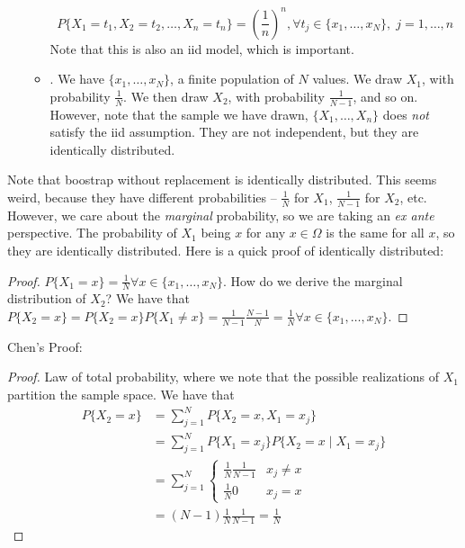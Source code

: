 \documentclass[10pt]{article}
\begin{document}
\begin{definition}
\begin{itemize}
\begin{itemize}
			\[
			P\{X_1 = t_1,X_2 = t_2,\dots,X_n = t_n\} = \left(\frac{1}{n}\right)^n, \forall t_j \in \{x_1,\dots,x_N\},\;j = 1,\dots,n
			\]
			Note that this is also an iid model, which is important.
			\item {}. We have $\{x_1,\dots,x_N\}$, a finite population of $N$ values. We draw $X_1$, with probability $\frac{1}{N}$. We then draw $X_2$, with probability $\frac{1}{N-1}$, and so on. However, note that the sample we have drawn, $\{X_1,\dots,X_n\}$ does \emph{not} satisfy the iid assumption. They are not independent, but they are identically distributed.
		\end{itemize}
	\end{itemize}
	Note that boostrap without replacement is identically distributed. This seems weird, because they have different probabilities -- $\frac{1}{N}$ for $X_1$, $\frac{1}{N-1}$ for $X_2$, etc. However, we care about the \emph{marginal} probability, so we are taking an \emph{ex ante} perspective. The probability of $X_1$ being $x$ for any $x \in \Omega$ is the same for all $x$, so they are identically distributed. Here is a quick proof of identically distributed:
	
	\begin{proof}
		$P\{X_1 = x\} = \frac{1}{N} \forall x \in \{x_1,\dots,x_N\}$. How do we derive the marginal distribution of $X_2$? We have that $P\{X_2 = x\} = P\{X_2 = x\} P\{X_1 \ne x\} = \frac{1}{N - 1} \frac{N - 1}{N} = \frac{1}{N} \forall x \in \{x_1,\dots,x_N\}$.
	\end{proof}
	
	Chen's Proof:
	
	\begin{proof}
		Law of total probability, where we note that the possible realizations of $X_1$ partition the sample space. We have that
		\begin{align*}
		P\{X_2 = x\} &= \sum_{j=1}^N P\{X_2 = x, X_1 = x_j\} \\
		&= \sum_{j=1}^N P\{X_1 = x_j\} P\{X_2 = x \mid X_1 = x_j\} \\
		&= \sum_{j=1}^N \begin{cases} \frac{1}{N} \frac{1}{N-1} & x_j \ne x \\ \frac{1}{N	} 0 & x_j = x \end{cases} \\
		&= (N-1) \frac{1}{N} \frac{1}{N-1} = \frac{1}{N}
		\end{align*}
	\end{proof}
\end{definition}
\end{document}
